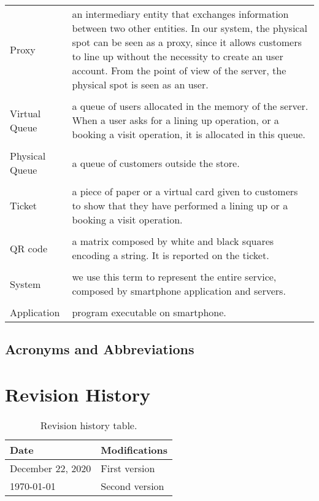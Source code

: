 \begin{tabularx}{\textwidth}{ >{\hsize=0.2\textwidth}X >{\hsize=0.8\textwidth}X}
    Proxy          & an intermediary entity that exchanges information between two other entities. In our system, the physical spot can be seen as a proxy, since it allows customers to line up without the necessity to create an user account. From the point of view of the server, the physical spot is seen as an user. \\ \\
    Virtual Queue & a queue of users allocated in the memory of the server. When a user asks for a lining up operation, or a booking a visit operation, it is allocated in this queue.\\ \\
    Physical Queue & a queue of customers outside the store.\\ \\
    Ticket & a piece of paper or a virtual card given to customers to show that they have performed a lining up or a booking a visit operation.\\ \\
    QR code & a matrix composed by white and black squares encoding a string. It is reported on the ticket.         \\ \\
    System & we use this term to represent the entire service, composed by smartphone application and servers.\\ \\
    Application & program executable on smartphone.
\end{tabularx}

\subsection{Acronyms and Abbreviations}
\printglossary


\section{Revision History}

\begin{table}[H]
    \centering
    \begin{tabular}{ m{} | m{} }
        \textbf{Date}     & \textbf{Modifications} \\
        \hline
        December 22, 2020 & First version          \\
        \today            & Second version
    \end{tabular}
    \caption{Revision history table.}
    \label{table:revisionHistory}
\end{table}


